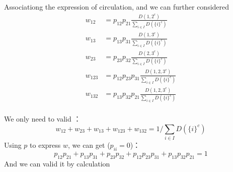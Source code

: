 \documentclass[11pt,en,cite=authoryear]{elegantpaper}
\begin{document}
Associationg the expression of circulation, and we can further considered
\begin{align*}
    w_{12} &= p_{12}p_{21} \frac{D({1, 2}^c)}{\sum_{i\in I} D(\{i\}^c)} \\
    w_{13} &= p_{13}p_{31} \frac{D({1, 3}^c)}{\sum_{i\in I} D(\{i\}^c)} \\
    w_{23} &= p_{23}p_{32} \frac{D({2, 3}^c)}{\sum_{i\in I} D(\{i\}^c)} \\
    w_{123} &= p_{12}p_{23}p_{31} \frac{D({1, 2, 3}^c)}{\sum_{i\in I} D(\{i\}^c)} \\
    w_{132} &= p_{13}p_{32}p_{21} \frac{D({1, 2, 3}^c)}{\sum_{i\in I} D(\{i\}^c)} \\
\end{align*}

We only need to valid ：
$$
w_{12} + w_{23} + w_{13} + w_{123} + w_{132} = 1 / \sum_{i\in I} D(\{i\}^c)
$$
Using $p$ to express $w$, we can get ($p_{ii}=0$)：
$$
p_{12}p_{21} + p_{13}p_{31} + p_{23}p_{32} + p_{12}p_{23}p_{31} + p_{13}p_{32}p_{21} = 1
$$
And we can valid it by calculation
\end{document}
